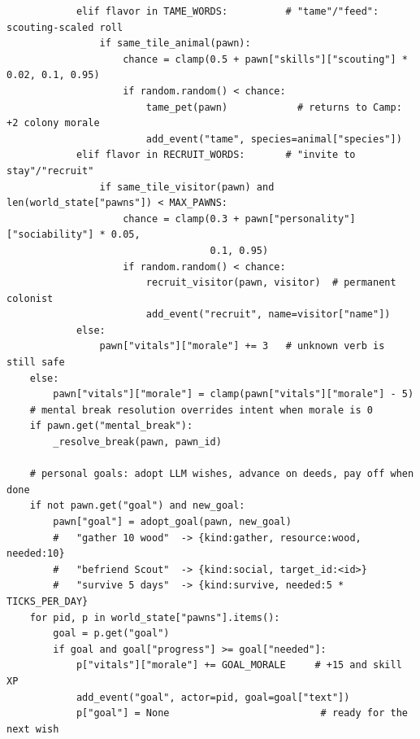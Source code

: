 \documentclass[10pt,a4paper]{article}
\begin{document}
\begin{lstlisting}
            elif flavor in TAME_WORDS:          # "tame"/"feed": scouting-scaled roll
                if same_tile_animal(pawn):
                    chance = clamp(0.5 + pawn["skills"]["scouting"] * 0.02, 0.1, 0.95)
                    if random.random() < chance:
                        tame_pet(pawn)            # returns to Camp: +2 colony morale
                        add_event("tame", species=animal["species"])
            elif flavor in RECRUIT_WORDS:       # "invite to stay"/"recruit"
                if same_tile_visitor(pawn) and len(world_state["pawns"]) < MAX_PAWNS:
                    chance = clamp(0.3 + pawn["personality"]["sociability"] * 0.05,
                                   0.1, 0.95)
                    if random.random() < chance:
                        recruit_visitor(pawn, visitor)  # permanent colonist
                        add_event("recruit", name=visitor["name"])
            else:
                pawn["vitals"]["morale"] += 3   # unknown verb is still safe
    else:
        pawn["vitals"]["morale"] = clamp(pawn["vitals"]["morale"] - 5)
    # mental break resolution overrides intent when morale is 0
    if pawn.get("mental_break"):
        _resolve_break(pawn, pawn_id)

    # personal goals: adopt LLM wishes, advance on deeds, pay off when done
    if not pawn.get("goal") and new_goal:
        pawn["goal"] = adopt_goal(pawn, new_goal)
        #   "gather 10 wood"  -> {kind:gather, resource:wood, needed:10}
        #   "befriend Scout"  -> {kind:social, target_id:<id>}
        #   "survive 5 days"  -> {kind:survive, needed:5 * TICKS_PER_DAY}
    for pid, p in world_state["pawns"].items():
        goal = p.get("goal")
        if goal and goal["progress"] >= goal["needed"]:
            p["vitals"]["morale"] += GOAL_MORALE     # +15 and skill XP
            add_event("goal", actor=pid, goal=goal["text"])
            p["goal"] = None                          # ready for the next wish


\end{lstlisting}
\end{document}
